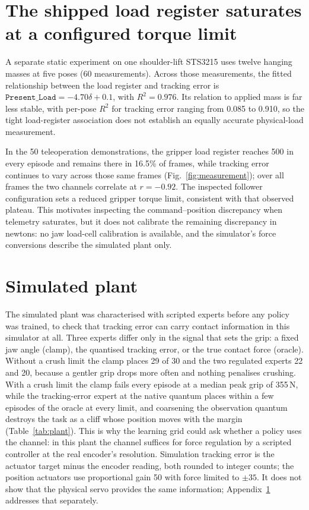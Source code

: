 \documentclass{article}
\begin{document}
\section{The shipped load register saturates at a configured torque limit}
\label{app:measure}
A separate static experiment on one shoulder-lift STS3215 uses twelve hanging
masses
at five poses (60 measurements). Across those measurements, the fitted
relationship between the load register and tracking error is
$\texttt{Present\_Load}=-4.70\delta+0.1$, with $R^2=0.976$.
Its relation to applied mass is far less stable, with per-pose $R^2$ for
tracking error ranging from 0.085 to 0.910, so the tight load-register
association does not establish an equally accurate physical-load measurement.

In the 50 teleoperation demonstrations, the gripper load register reaches
500 in every episode and remains there in 16.5\% of frames, while tracking
error continues to vary across those same frames (Fig.~\ref{fig:measurement});
over all frames the two channels correlate at $r=-0.92$. The inspected follower
configuration sets a reduced gripper torque limit, consistent with that
observed plateau. This motivates inspecting the command--position discrepancy
when telemetry saturates, but it does not calibrate the remaining discrepancy
in newtons: no jaw load-cell calibration is available, and the simulator's force
conversions describe the simulated plant only.

\section{Simulated plant}
\label{app:plant}
The simulated plant was characterised with scripted experts before any policy
was trained, to check that tracking error can carry contact information in
this simulator at all. Three experts differ only in the signal that sets the
grip: a fixed jaw angle (clamp), the quantised tracking error, or the true
contact force (oracle). Without a crush limit the clamp places 29 of 30 and
the two regulated experts 22 and 20, because a gentler grip drops more often
and nothing penalises crushing. With a crush limit the clamp fails every
episode at a median peak grip of 355\,N, while the tracking-error expert at
the native quantum places within a few episodes of the oracle at every limit,
and coarsening the observation quantum destroys the task as a cliff whose
position moves with the margin (Table~\ref{tab:plant}). This is why the
learning grid could ask whether a policy uses the channel: in this plant the
channel suffices for force regulation by a scripted controller at the real
encoder's resolution. Simulation tracking error is the actuator target minus
the encoder reading, both rounded to integer counts; the position actuators
use proportional gain 50 with force limited to $\pm35$. It does not show that the physical servo provides the
same information; Appendix~\ref{app:measure} addresses that separately.
\end{document}
